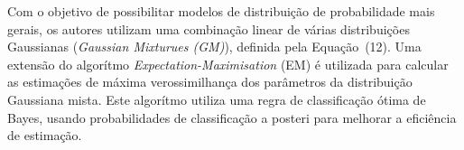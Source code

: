 \documentclass[a4paper,titlepage]{article}
\begin{document}
\begin{center}
  \vspace{1em}
  \vspace{1em}
\end{center}

Com o objetivo de possibilitar modelos de distribuição de probabilidade mais
gerais, os autores utilizam uma combinação linear de várias distribuições
Gaussianas (\textit{Gaussian Mixturues (GM)}), definida pela Equação~(12).
Uma extensão do algorítmo \textit{Expectation-Maximisation} (EM) é utilizada
para calcular as estimações de máxima verossimilhança dos parâmetros da
distribuição Gaussiana mista. Este algorítmo utiliza uma regra de classificação
ótima de Bayes, usando probabilidades de classificação a posteri para melhorar
a eficiência de estimação.

\begin{center}
  \vspace{1em}
  \vspace{1em}
\end{center}
\end{document}
